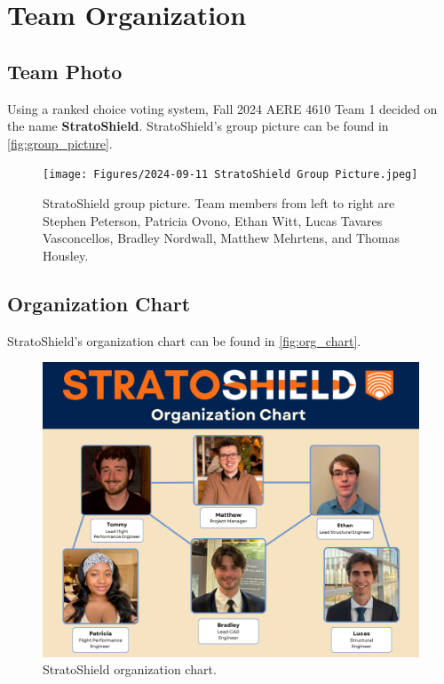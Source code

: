 \chapter{Team Organization}\label{cp:team_org}

\section{Team Photo}

Using a ranked choice voting system, Fall 2024 AERE 4610 Team 1 decided on the name \textbf{StratoShield}. StratoShield's group picture can be found in \autoref{fig:group_picture}.

\begin{figure}[htpb]
    \centering
    \texttt{[image: Figures/2024-09-11 StratoShield Group Picture.jpeg]}
    \caption{StratoShield group picture. Team members from left to right are Stephen Peterson, Patricia Ovono, Ethan Witt, Lucas Tavares Vasconcellos, Bradley Nordwall, Matthew Mehrtens, and Thomas Housley.}
    \label{fig:group_picture}
\end{figure}

\section{Organization Chart}

StratoShield's organization chart can be found in \autoref{fig:org_chart}.

\begin{figure}[htpb]
    \centering
    \includegraphics[width=0.95\linewidth]{Figures/StratoShield Organization Chart v1.1.0.png}
    \caption{StratoShield organization chart.}
    \label{fig:org_chart}
\end{figure}